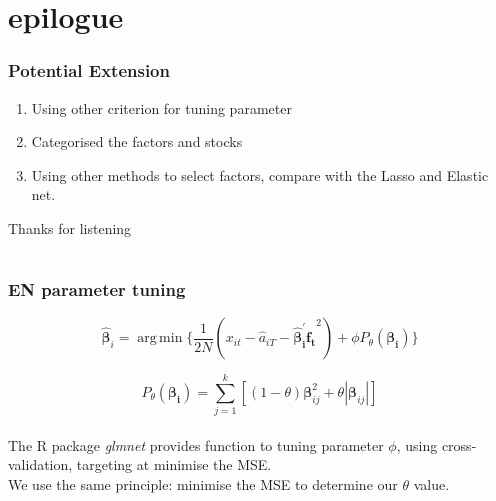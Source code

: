 \documentclass[12pt]{beamer}
\DeclareMathOperator*{\argmin}{arg\,min}
\begin{document}


\section*{epilogue}
\begin{frame}
\frametitle{Potential Extension}
\begin{enumerate}
\item Using other criterion for tuning parameter
\item Categorised the factors and stocks
\item Using other methods to select factors, compare with the Lasso and Elastic net.
\end{enumerate}
\end{frame}


\begin{frame}
	\centering	
\huge{ Thanks for listening\\}
\end{frame}

	\section*{}
\begin{frame}
\frametitle{EN parameter tuning}
\[	\boldsymbol{\hat{\beta}}_{i} = \argmin \{ \frac{1}{2N} (x_{it}-\hat{a}_{iT} - \boldsymbol{\hat{\beta}_{i}^{\prime}f_t}^2 ) +\phi P_{\theta}(\boldsymbol{\beta_i})  \} \]

\[	P_{\theta}(\boldsymbol{\beta_i}) =\sum_{j=1}^k [ (1-\theta)\boldsymbol{\beta}_{ij}^2 + \theta |\boldsymbol{\beta}_{ij}|] \] \\
The R package \textit{glmnet} provides function to tuning parameter $\phi$, using cross-validation, targeting at minimise the MSE.\\
We use the same principle: minimise the MSE to determine our $\theta$ value.\\
\end{frame}
\end{document}
